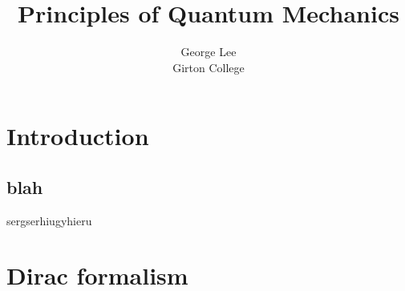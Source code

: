 \documentclass{article}
\title{Principles of Quantum Mechanics}
\author{George Lee\\Girton College}
\begin{document}
\maketitle
\section{Introduction}
\subsection{blah}
sergserhiugyhieru
\section{Dirac formalism}
\end{document}
